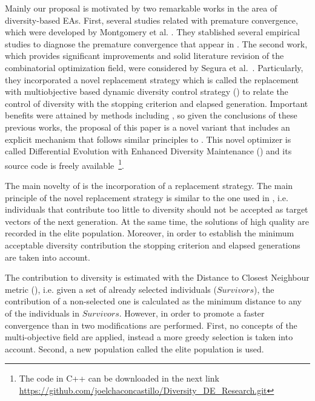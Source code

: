 Mainly our proposal is motivated by two remarkable works in the area of diversity-based EAs.
%
First, several studies related with premature convergence, which were developed by Montgomery et al. \cite{montgomery2012simple}.
%
They stablished several empirical studies to diagnose the premature convergence that appear in \DE{}.
%
The second work, which provides significant improvements and solid literature revision of the combinatorial optimization field, were considered by Segura et al.~\cite{segura2016novel}.
%
Particularly, they incorporated a novel replacement strategy which is called the replacement with multiobjective based dynamic diversity control strategy (\RMDDC{}) to relate the control of diversity with the stopping criterion and elapsed generation.
%
Important benefits were attained by methods including \RMDDC{}, so given the conclusions of these previous works, the proposal of this paper is a 
novel \DE{} variant that includes an explicit mechanism that follows similar principles to \RMDDC{}.
%
This novel optimizer is called Differential Evolution with Enhanced Diversity Maintenance (\DEEDM{}) and its source
code is freely available~\footnote{The code in C++ can be downloaded in the next link \url{https://github.com/joelchaconcastillo/Diversity\_DE\_Research.git}}.

The main novelty of \DEEDM{} is the incorporation of a replacement strategy.
%
The main principle of the novel replacement strategy is similar to the one used in \RMDDC{}, i.e.
individuals that contribute too little to diversity should not be accepted as target vectors of the next generation.
%
At the same time, the solutions of high quality are recorded in the elite population.
%
Moreover, in order to establish the minimum acceptable diversity contribution the stopping criterion and elapsed
generations are taken into account.

The contribution to diversity is estimated with the Distance to Closest Neighbour metric (\DCN{}), i.e. given
a set of already selected individuals ($Survivors$), the contribution of a non-selected one is calculated as the minimum
distance to any of the individuals in $Survivors$.
%
However, in order to promote a faster convergence than in \RMDDC{} two modifications are performed.
%
First, no concepts of the multi-objective field are applied, instead a more greedy selection is taken into account.
%
Second, a new population called the elite population is used.

